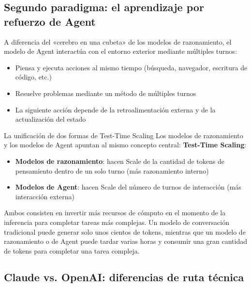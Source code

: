 \subsection{Segundo paradigma: el aprendizaje por refuerzo de Agent}

A diferencia del «cerebro en una cubeta» de los modelos de razonamiento, el modelo de Agent interactúa con el entorno exterior mediante múltiples turnos:

\begin{itemize}
    \item Piensa y ejecuta acciones al mismo tiempo (búsqueda, navegador, escritura de código, etc.)
    \item Resuelve problemas mediante un método de múltiples turnos
    \item La siguiente acción depende de la retroalimentación externa y de la actualización del estado
\end{itemize}

\begin{importantbox}{La unificación de dos formas de Test-Time Scaling}
Los modelos de razonamiento y los modelos de Agent apuntan al mismo concepto central: \textbf{Test-Time Scaling}:
\begin{itemize}
    \item \textbf{Modelos de razonamiento}: hacen Scale de la cantidad de tokens de pensamiento dentro de un solo turno (más razonamiento interno)
    \item \textbf{Modelos de Agent}: hacen Scale del número de turnos de interacción (más interacción externa)
\end{itemize}
Ambos consisten en invertir más recursos de cómputo en el momento de la inferencia para completar tareas más complejas. Un modelo de conversación tradicional puede generar solo unos cientos de tokens, mientras que un modelo de razonamiento o de Agent puede tardar varias horas y consumir una gran cantidad de tokens para completar una tarea compleja.
\end{importantbox}

\subsection{Claude vs. OpenAI: diferencias de ruta técnica}

